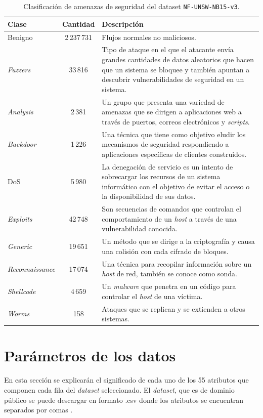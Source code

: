 \begin{table}[H]
\begin{tabular}{|l|c|>{\RaggedRight}p{8cm}|} %
\hline
\rowcolor[HTML]{C0C0C0} 
\textbf{Clase} & \textbf{Cantidad} & \textbf{Descripción} \\ \hline
Benigno & 2\,237\,731 & Flujos normales no maliciosos. \\ \hline
\textit{Fuzzers} & 33\,816 & Tipo de ataque en el que el atacante envía grandes cantidades de datos aleatorios que hacen que un sistema se bloquee y también apuntan a descubrir vulnerabilidades de seguridad en un sistema. \\ \hline
\textit{Analysis} & 2\,381 & Un grupo que presenta una variedad de amenazas que se dirigen a aplicaciones web a través de puertos, correos electrónicos y \textit{scripts}. \\ \hline
\textit{Backdoor} & 1\,226 & Una técnica que tiene como objetivo eludir los mecanismos de seguridad respondiendo a aplicaciones específicas de clientes construidos. \\ \hline
DoS & 5\,980 & La denegación de servicio es un intento de sobrecargar los recursos de un sistema informático con el objetivo de evitar el acceso o la disponibilidad de sus datos. \\ \hline
\textit{Exploits} & 42\,748 & Son secuencias de comandos que controlan el comportamiento de un \textit{host} a través de una vulnerabilidad conocida. \\ \hline
\textit{Generic} & 19\,651 & Un método que se dirige a la criptografía y causa una colisión con cada cifrado de bloques. \\ \hline
\textit{Reconnaissance} & 17\,074 & Una técnica para recopilar información sobre un \textit{host} de red, también se conoce como sonda. \\ \hline
\textit{Shellcode} & 4\,659 & Un \textit{malware} que penetra en un código para controlar el \textit{host} de una víctima. \\ \hline
\textit{Worms} & 158 & Ataques que se replican y se extienden a otros sistemas. \\ \hline
\end{tabular}
\centering
\caption{Clasificación de amenazas de seguridad del dataset \texttt{NF-UNSW-NB15-v3}.} 
\label{tab:attacks-tab}
\end{table}

\section{Parámetros de los datos} \label{sec.param-datos}
En esta sección se explicarán el significado de cada uno de los 55 atributos que componen cada fila del \textit{dataset} seleccionado. El \textit{dataset}, que es de dominio público se puede descargar en formato .csv donde los atributos se encuentran separados por comas \cite{luay2025NetFlowDatasetsV3}.

